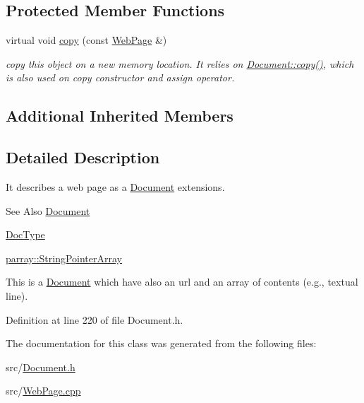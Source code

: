\subsection*{Protected Member Functions}
\begin{DoxyCompactItemize}
\item 
\hypertarget{classdocs_1_1WebPage_a52ac0dc90ab3f5621d0fa41d8386806c}{virtual void \hyperlink{classdocs_1_1WebPage_a52ac0dc90ab3f5621d0fa41d8386806c}{copy} (const \hyperlink{classdocs_1_1WebPage}{Web\-Page} \&)}\label{classdocs_1_1WebPage_a52ac0dc90ab3f5621d0fa41d8386806c}

\begin{DoxyCompactList}\small\item\em copy this object on a new memory location. It relies on \hyperlink{classdocs_1_1Document_ad8b6a91c7a8e39a880790d14aba14322}{Document\-::copy()}, which is also used on copy constructor and assign operator. \end{DoxyCompactList}\end{DoxyCompactItemize}
\subsection*{Additional Inherited Members}


\subsection{Detailed Description}
It describes a web page as a \hyperlink{classdocs_1_1Document}{Document} extensions. 

\begin{DoxySeeAlso}{See Also}
\hyperlink{classdocs_1_1Document}{Document} 

\hyperlink{classdocs_1_1DocType}{Doc\-Type} 

\hyperlink{classparray_1_1StringPointerArray}{parray\-::\-String\-Pointer\-Array}
\end{DoxySeeAlso}
This is a \hyperlink{classdocs_1_1Document}{Document} which have also an url and an array of contents (e.\-g., textual line). 

Definition at line 220 of file Document.\-h.



The documentation for this class was generated from the following files\-:\begin{DoxyCompactItemize}
\item 
src/\hyperlink{Document_8h}{Document.\-h}\item 
src/\hyperlink{WebPage_8cpp}{Web\-Page.\-cpp}\end{DoxyCompactItemize}
